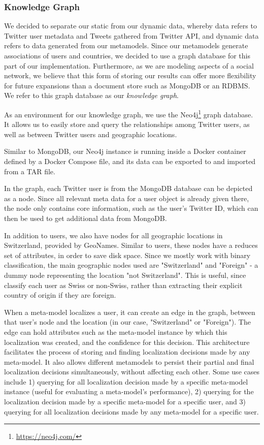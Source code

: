 \documentclass[10pt,a4paper]{article}
\begin{document}
\subsubsection{Knowledge Graph}
We decided to separate our static from our dynamic data, whereby data refers to Twitter user metadata and Tweets gathered from Twitter API, and dynamic data refers to data generated from our metamodels. Since our metamodels generate associations of users and countries, we decided to use a graph database for this part of our implementation. Furthermore, as we are modeling aspects of a social network, we believe that this form of storing our results can offer more flexibility for future expansions than a document store such as MongoDB or an RDBMS. We refer to this graph database as our \textit{knowledge graph}.

As an environment for our knowledge graph, we use the Neo4j\footnote{\href{https://neo4j.com/}{https://neo4j.com/}} graph database. It allows us to easily store and query the relationships among Twitter users, as well as between Twitter users and geographic locations. 

Similar to MongoDB, our Neo4j instance is running inside a Docker container defined by a Docker Compose file, and its data can be exported to and imported from a TAR file.

In the graph, each Twitter user is from the MongoDB database can be depicted as a node. Since all relevant meta data for a user object is already given there, the node only contains core information, such as the user's Twitter ID, which can then be used to get additional data from MongoDB. 

In addition to users, we also have nodes for all geographic locations in Switzerland, provided by GeoNames. Similar to users, these nodes have a reduces set of attributes, in order to save disk space. Since we mostly work with binary classification, the main geographic nodes used are "Switzerland" and "Foreign" - a dummy node representing the location "not Switzerland". This is useful, since classify each user as Swiss or non-Swiss, rather than extracting their explicit country of origin if they are foreign.

When a meta-model localizes a user, it can create an edge in the graph, between that user's node and the location (in our case, "Switzerland" or "Foreign"). The edge can hold attributes such as the meta-model instance by which this localization was created, and the confidence for this decision. This architecture facilitates the process of storing and finding localization decisions made by any meta-model. It also allows different metamodels to persist their partial and final localization decisions simultaneously, without affecting each other. Some use cases include 1) querying for all localization decision made by a specific meta-model instance (useful for evaluating a meta-model's performance), 2) querying for the localization decision made by a specific meta-model for a specific user, and 3) querying for all localization decisions made by any meta-model for a specific user.
\end{document}
